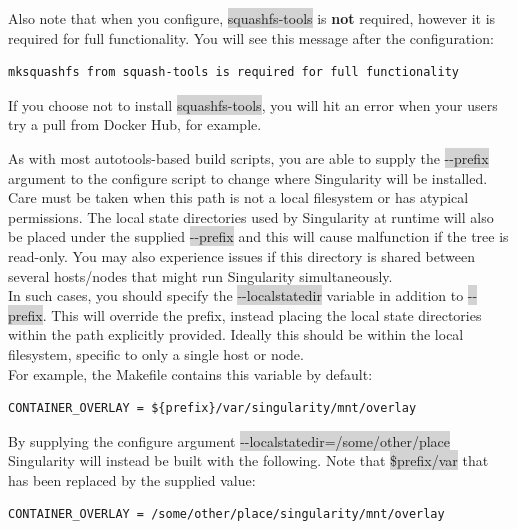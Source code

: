 \documentclass[a4paper]{article}
\newcounter{subsubsubsection}[subsubsection]
\begin{document}
Also note that when you configure, \colorbox{lightgray}{squashfs-tools} is \textbf{not} required, however it is required for full functionality. You will see this message after the configuration:\\[0.1in]

\begin{lstlisting}[frame=single]
mksquashfs from squash-tools is required for full functionality
\end{lstlisting}

If you choose not to install \colorbox{lightgray}{squashfs-tools}, you will hit an error when your users try a pull from Docker Hub, for example.


As with most autotools-based build scripts, you are able to supply the \colorbox{lightgray}{-{}-prefix} argument to the configure script to change where Singularity will be installed. Care must be taken when this path is not a local filesystem or has atypical permissions. The local state directories used by Singularity at runtime will also be placed under the supplied \colorbox{lightgray}{-{}-prefix} and this will cause malfunction if the tree is read-only. You may also experience issues if this directory is shared between several hosts/nodes that might run Singularity simultaneously.\\[0.1in]

In such cases, you should specify the \colorbox{lightgray}{-{}-localstatedir} variable in addition to \colorbox{lightgray}{-{}-prefix}. This will override the prefix, instead placing the local state directories within the path explicitly provided. Ideally this should be within the local filesystem, specific to only a single host or node.\\[0.1in]

For example, the Makefile contains this variable by default:

\begin{lstlisting}[frame=single]
CONTAINER_OVERLAY = ${prefix}/var/singularity/mnt/overlay
\end{lstlisting}

By supplying the configure argument \colorbox{lightgray}{-{}-localstatedir=/some/other/place} Singularity will instead be built with the following. Note that \colorbox{lightgray}{\${prefix}/var} that has been replaced by the supplied value:

\begin{lstlisting}[frame=single]
CONTAINER_OVERLAY = /some/other/place/singularity/mnt/overlay
\end{lstlisting}
\end{document}
